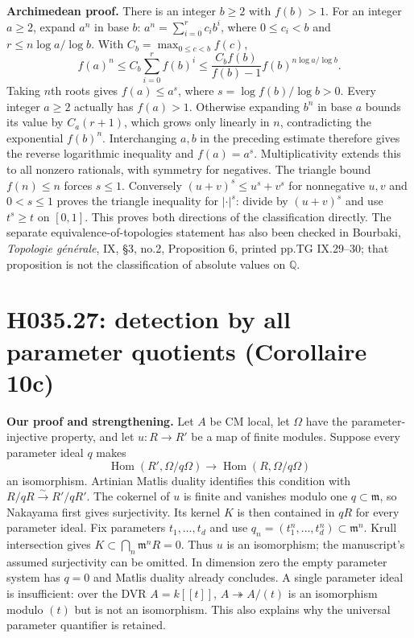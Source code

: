 \textbf{Archimedean proof.} There is an integer $b\geq2$ with
$f(b)>1$. For an integer $a\geq2$, expand $a^n$ in base $b$:
$a^n=\sum_{i=0}^r c_i b^i$, where $0\leq c_i<b$ and
$r\leq n\log a/\log b$. With $C_b=\max_{0\leq c<b}f(c)$,
\[
 f(a)^n\leq C_b\sum_{i=0}^r f(b)^i
 \leq \frac{C_b f(b)}{f(b)-1}
              f(b)^{n\log a/\log b}.
\]
Taking $n$th roots gives $f(a)\leq a^s$, where
$s=\log f(b)/\log b>0$. Every integer $a\geq2$ actually has
$f(a)>1$. Otherwise expanding $b^n$ in base $a$ bounds its value
by $C_a(r+1)$, which grows only linearly in $n$, contradicting the
exponential $f(b)^n$. Interchanging $a,b$ in the preceding estimate
therefore gives the reverse logarithmic inequality and $f(a)=a^s$.
Multiplicativity extends this to all nonzero rationals, with symmetry
for negatives. The triangle bound $f(n)\leq n$ forces $s\leq1$.
Conversely $(u+v)^s\leq u^s+v^s$ for nonnegative $u,v$ and
$0<s\leq1$ proves the triangle inequality for $|\cdot|^s$:
divide by $(u+v)^s$ and use $t^s\geq t$ on $[0,1]$.
This proves both directions of the classification directly. The separate
equivalence-of-topologies statement has also been checked in Bourbaki,
\emph{Topologie générale}, IX, \S3, no.2, Proposition 6,
printed pp.TG IX.29--30; that proposition is not the classification
of absolute values on $\mathbb Q$.

\section{H035.27: detection by all parameter quotients (Corollaire 10c)}
\textbf{Our proof and strengthening.} Let $A$ be CM local, let
$\Omega$ have the parameter-injective property, and let $u:R\to R'$
be a map of finite modules. Suppose every parameter ideal $q$ makes
\[
 \operatorname{Hom}(R',\Omega/q\Omega)\longrightarrow
 \operatorname{Hom}(R,\Omega/q\Omega)
\]
an isomorphism. Artinian Matlis duality identifies this condition with
$R/qR\xrightarrow\sim R'/qR'$. The cokernel of $u$ is finite and
vanishes modulo one $q\subset\mathfrak m$, so Nakayama first gives
surjectivity. Its kernel $K$ is then contained in $qR$ for every
parameter ideal. Fix parameters $t_1,\ldots,t_d$ and use
$q_n=(t_1^n,\ldots,t_d^n)\subset\mathfrak m^n$. Krull intersection
gives $K\subset\bigcap_n\mathfrak m^nR=0$. Thus $u$ is an
isomorphism; the manuscript's assumed surjectivity can be omitted.
In dimension zero the empty parameter system has $q=0$ and Matlis
duality already concludes. A single parameter ideal is insufficient:
over the DVR $A=k[[t]]$, $A\twoheadrightarrow A/(t)$ is an
isomorphism modulo $(t)$ but is not an isomorphism. This also explains
why the universal parameter quantifier is retained.

